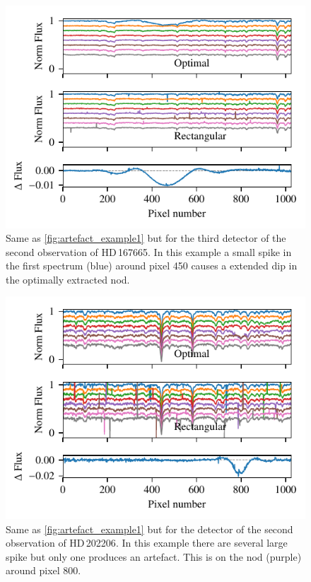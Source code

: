 \begin{figure}
    \centering
    \includegraphics[width=0.7\linewidth]{figures/appendix/bp_plots/extraction_comparision_HD167665-1b_chip_3}
    \caption{Same as \cref{fig:artefact_example1} but for the third detector of the second observation of {HD\,167665}.
        In this example a small spike in the first spectrum (blue) around pixel 450 causes a extended dip in the optimally extracted nod.}
    \label{fig:artefact_example3}
\end{figure}
\begin{figure}
    \centering
    \includegraphics[width=0.7\linewidth]{figures/appendix/bp_plots/extraction_comparision_HD202206-2_chip_1}
    \caption{Same as \cref{fig:artefact_example1} but for the  detector of the second observation of {HD\,202206}.
        In this example there are several large spike but only one produces an artefact.
        This is on the  nod (purple) around pixel 800.}
    \label{fig:artefact_example4}
\end{figure}
